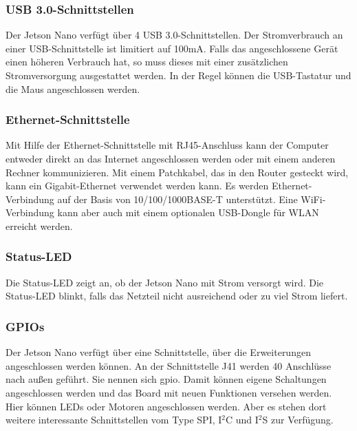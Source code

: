 





\subsubsection{USB 3.0-Schnittstellen}

Der Jetson Nano verfügt über 4 USB 3.0-Schnittstellen. Der Stromverbrauch an einer USB-Schnittstelle ist limitiert auf 100mA. Falls das angeschlossene Gerät einen höheren Verbrauch hat, so muss dieses mit einer zusätzlichen Stromversorgung ausgestattet werden. In der Regel können die USB-Tastatur und die Maus angeschlossen werden. 

\subsubsection{Ethernet-Schnittstelle}

Mit Hilfe der Ethernet-Schnittstelle mit RJ45-Anschluss kann der Computer entweder direkt an das Internet angeschlossen werden oder mit einem anderen Rechner kommunizieren. Mit einem Patchkabel, das in den Router gesteckt wird, kann ein Gigabit-Ethernet verwendet werden kann. Es werden Ethernet-Verbindung auf der Basis von 10/100/1000BASE-T unterstützt.
Eine WiFi-Verbindung kann aber auch mit einem optionalen USB-Dongle für WLAN erreicht werden.


\subsubsection{Status-LED}

Die Status-LED zeigt an, ob der Jetson Nano mit Strom versorgt wird. Die Status-LED blinkt, falls das Netzteil nicht ausreichend oder zu viel Strom liefert.



\subsubsection{GPIOs}

Der Jetson Nano verfügt über eine Schnittstelle, über die Erweiterungen angeschlossen werden können.
An der Schnittstelle J41 werden 40 Anschlüsse nach außen geführt. Sie nennen sich \ac{gpio}. Damit können eigene Schaltungen angeschlossen werden und das Board  mit neuen Funktionen versehen werden. Hier können LEDs oder Motoren angeschlossen werden. 
Aber es stehen dort weitere interessante Schnittstellen vom Type SPI,  I$^2$C und  I$^2$S zur Verfügung.


